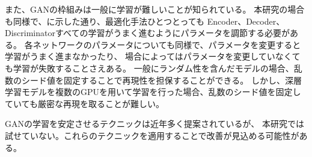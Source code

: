 また、GANの枠組みは一般に学習が難しいことが知られている。
本研究の場合も同様で、に示した通り、最適化手法ひとつとっても
Encoder、Decoder、Discriminatorすべての学習がうまく進むようにパラメータを調節する必要がある。
各ネットワークのパラメータについても同様で、パラメータを変更すると学習がうまく進まなかったり、
場合によってはパラメータを変更していなくても学習が失敗することさえある。
一般にランダム性を含んだモデルの場合、乱数のシード値を固定することで再現性を担保することができる。
しかし、深層学習モデルを複数のGPUを用いて学習を行った場合、乱数のシード値を固定していても厳密な再現を取ることが難しい。

GANの学習を安定させるテクニックは近年多く提案されている\cite{gan_techniques, Neyshabur2017}が、
本研究では試せていない。これらのテクニックを適用することで改善が見込める可能性がある。
